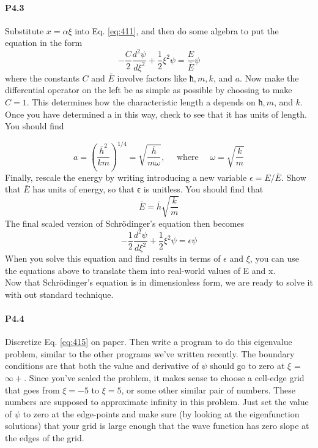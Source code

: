 \paragraph*{P4.3}  Substitute $x = \alpha \xi$ into Eq. \eqref{eq:411}, and then do some algebra to put the
equation in the form
\begin{equation}\label{eq:412}
-\frac{C}{2} \frac{d^{2} \psi}{d \xi^{2}}+\frac{1}{2} \xi^{2} \psi=\frac{E}{\bar{E}} \psi
\end{equation}
where the constants $C$ and $\bar{E}$ involve factors like $ħ, m, k$, and $a$.
Now make the differential operator on the left be as simple as possible by
choosing to make $C = 1$. This determines how the characteristic length a
depends on $ħ, m$, and $k$. Once you have determined a in this way, check to
see that it has units of length. You should find

\begin{equation}\label{eq:413}
a=\left(\frac{\bar{h}^{2}}{k m}\right)^{1 / 4}=\sqrt{\frac{\bar{h}}{m \omega}}, \quad \text { where } \quad \omega=\sqrt{\frac{k}{m}}
\end{equation}
Finally, rescale the energy by writing introducing a new variable $	\epsilon = E/\bar{E}$.
Show that $\bar{E}$ has units of energy, so that ϵ is unitless. You should find that
 \begin{equation}\label{eq:414}
\bar{E} = \bar{h}\sqrt{\frac{k}{m}}
\end{equation}
The final scaled version of Schrödinger\rq s equation then becomes
\begin{equation}\label{eq:415}
-\frac{1}{2} \frac{d^{2} \psi}{d \xi^{2}}+\frac{1}{2} \xi^{2} \psi=\epsilon \psi
\end{equation}
When you solve this equation and find results in terms of $\epsilon$ and $\xi$, you can
use the equations above to translate them into real-world values of E and x.\\
Now that Schrödinger\rq s equation is in dimensionless form, we are ready to
solve it with out standard technique.


\paragraph*{P4.4}
Discretize Eq. \eqref{eq:415} on paper. Then write a program to do this eigenvalue
problem, similar to the other programs we\rq ve written recently. The boundary conditions are that both the value and derivative of $\psi$ should go to zero
at $\xi$ = $\infty +$. Since you\rq ve scaled the problem, it makes sense to choose a
cell-edge grid that goes from $\xi =  - 5$ to $\xi  = 5$, or some other similar pair
of numbers. These numbers are supposed to approximate infinity in this
problem. Just set the value of $\psi$ to zero at the edge-points and make sure
(by looking at the eigenfunction solutions) that your grid is large enough
that the wave function has zero slope at the edges of the grid.


